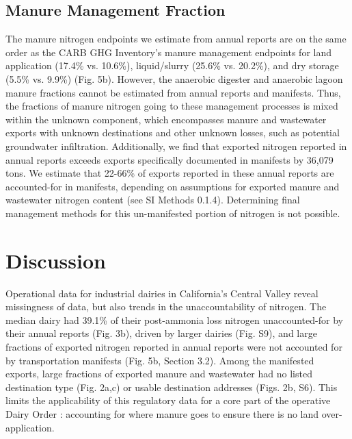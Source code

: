 \documentclass{iopjournal}
\begin{document}
\subsection{Manure Management Fraction}

The manure nitrogen endpoints we estimate from annual reports are on the same order as the CARB GHG Inventory's manure management endpoints for land application (17.4\% vs. 10.6\%), liquid/slurry (25.6\% vs. 20.2\%), and dry storage (5.5\% vs. 9.9\%) (Fig. 5b). However, the anaerobic digester and anaerobic lagoon manure fractions cannot be estimated from annual reports and manifests. Thus, the fractions of manure nitrogen going to these management processes is mixed within the unknown component, which encompasses manure and wastewater exports with unknown destinations and other unknown losses, such as potential groundwater infiltration. Additionally, we find that exported nitrogen reported in annual reports exceeds exports specifically documented in manifests by 36,079 tons. We estimate that 22-66\% of exports reported in these annual reports are accounted-for in manifests, depending on assumptions for exported manure and wastewater nitrogen content (see SI Methods 0.1.4). Determining final management methods for this un-manifested portion of nitrogen is not possible.

\section{Discussion}

Operational data for industrial dairies in California's Central Valley reveal missingness of data, but also trends in the unaccountability of nitrogen. The median dairy had 39.1\% of their post-ammonia loss nitrogen unaccounted-for by their annual reports (Fig. 3b), driven by larger dairies (Fig. S9), and large fractions of exported nitrogen reported in annual reports were not accounted for by transportation manifests (Fig. 5b, Section 3.2). Among the manifested exports, large fractions of exported manure and wastewater had no listed destination type (Fig. 2a,c) or usable destination addresses (Figs. 2b, S6). This limits the applicability of this regulatory data for a core part of the operative Dairy Order \cite{CVRWQCB_2013_Order}: accounting for where manure goes to ensure there is no land over-application.  
\end{document}
